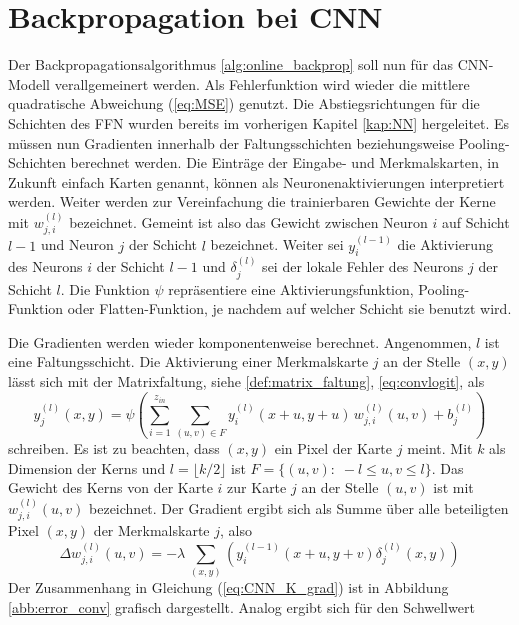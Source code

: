 \section{Backpropagation bei CNN}
\label{abs:CNN_train}
Der Backpropagationsalgorithmus \ref{alg:online_backprop} soll nun für das CNN-Modell verallgemeinert werden. 
Als Fehlerfunktion wird wieder die mittlere quadratische Abweichung (\ref{eq:MSE})
genutzt. 
Die Abstiegsrichtungen für die Schichten des FFN wurden bereits im vorherigen Kapitel \ref{kap:NN} hergeleitet. Es müssen nun Gradienten innerhalb der Faltungsschichten beziehungsweise Pooling-Schichten berechnet werden. Die Einträge der Eingabe- und Merkmalskarten, in Zukunft einfach Karten genannt, können als Neuronenaktivierungen interpretiert werden. Weiter werden zur Vereinfachung die trainierbaren Gewichte der Kerne mit $w_{j,i}^{(l)}$ bezeichnet. Gemeint ist also das Gewicht zwischen Neuron $i$ auf Schicht $l-1$ und Neuron $j$ der Schicht $l$ bezeichnet. Weiter sei $y_{i}^{(l-1)}$ die Aktivierung des Neurons $i$ der Schicht $l-1$ und $\delta_j^{(l)}$ sei der lokale Fehler des Neurons $j$ der Schicht $l$. Die Funktion $\psi$ repräsentiere eine Aktivierungsfunktion, Pooling-Funktion oder Flatten-Funktion, je nachdem auf welcher Schicht sie benutzt wird.

Die Gradienten werden wieder komponentenweise berechnet.
Angenommen, $l$ ist eine Faltungsschicht. Die Aktivierung einer Merkmalskarte $j$ an der Stelle $(x,y)$ lässt sich mit der Matrixfaltung, siehe \ref{def:matrix_faltung}, \ref{eq:convlogit}, als
\begin{equation}
    y_j^{(l)}(x,y) =\psi \left(\sum_{i=1}^{z_{in}} \sum_{(u,v) \in F} y_i^{(l)}(x+u,y+u)\,  w_{j,i}^{(l)}(u,v) +b_j^{(l)}\right)
\end{equation}   
schreiben. Es ist zu beachten, dass $(x,y)$ ein Pixel der Karte $j$ meint. Mit $k$ als Dimension der Kerns und $l=\lfloor k/2 \rfloor$ ist $F=\{(u,v): \; -l \leq u,v \leq l\}$.
Das Gewicht des Kerns von der Karte $i$ zur Karte $j$ an der Stelle $(u,v)$ ist mit $w^{(l)}_{j,i}(u,v)$ bezeichnet. Der Gradient ergibt sich als Summe über alle beteiligten Pixel $(x,y)$ der Merkmalskarte $j$, also
\begin{equation}
    \label{eq:CNN_K_grad}
    \Delta w_{j,i}^{(l)}(u,v)= -\lambda \, \sum_{(x,y)} \left( y_i^{(l-1)}(x+u,y+v) \delta_j^{(l)}(x,y)\right)
\end{equation}
Der Zusammenhang in Gleichung (\ref{eq:CNN_K_grad}) ist in Abbildung \ref{abb:error_conv} grafisch dargestellt. Analog ergibt sich für den Schwellwert


